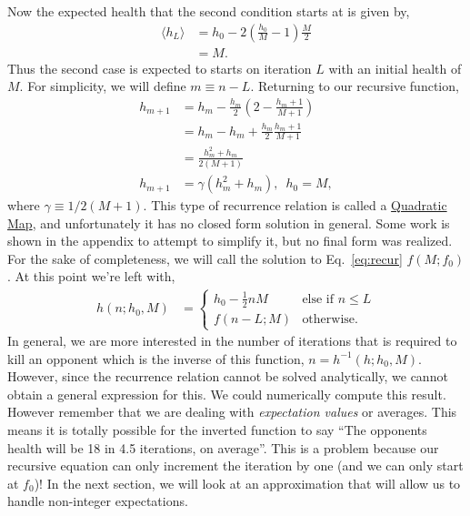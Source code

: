 \documentclass[../../main.tex]{subfiles}
\begin{document}
			Now the expected health that the second condition starts at is given by,
			\begin{align}
				\langle h_L \rangle &= h_0 - 2\left(\frac{h_0}{M} - 1\right) \frac{M}{2}\\
				&= M.
			\end{align}
			Thus the second case is expected to starts on iteration $L$ with an initial health of $M$. For simplicity, we will define $m\equiv n-L$. Returning to our recursive function,
			\begin{align}
				h_{m+1} &= h_{m} - \frac{h_m}{2}\left(2 - \frac{h_m + 1}{M+1}\right) \\
				&= h_{m} - h_m + \frac{h_m}{2}\frac{h_m + 1}{M+1} \\
				&= \frac{h_m^2 + h_m}{2(M+1)} \\
				h_{m+1} &= \gamma (h_m^2 + h_m),\,\,\,h_0 = M, \label{eq:recur}
			\end{align}
			where $\gamma\equiv1 / 2(M+1)$. This type of recurrence relation is called a \href{http://mathworld.wolfram.com/QuadraticMap.html}{Quadratic Map}, and unfortunately it has no closed form solution in general. Some work is shown in the appendix to attempt to simplify it, but no final form was realized. For the sake of completeness, we will call the solution to Eq.~\ref{eq:recur} $f(M; f_0)$. At this point we're left with,
			\begin{align}
					h(n; h_0, M) &=  \begin{cases}
					h_0 - \frac{1}{2}nM &\text{else if $n \le L$} \\
					f(n - L; M) &\text{otherwise}.
				\end{cases}
			\end{align}
			In general, we are more interested in the number of iterations that is required to kill an opponent which is the inverse of this function, $n=h^{-1}(h; h_0, M)$. However, since the recurrence relation cannot be solved analytically, we cannot obtain a general expression for this. We could numerically compute this result. However remember that we are dealing with \emph{expectation values} or averages. This means it is totally possible for the inverted function to say ``The opponents health will be 18 in 4.5 iterations, on average''. This is a problem because our recursive equation can only increment the iteration by one (and we can only start at $f_0$)! In the next section, we will look at an approximation that will allow us to handle non-integer expectations.
\end{document}
